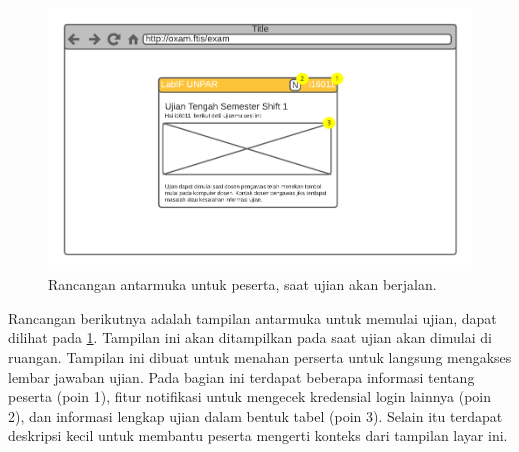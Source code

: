     \begin{figure}[H]
        \centering
        \includegraphics[width=0.7\paperwidth]{Gambar/mockups/Mockup--Peserta - Prestartstate.pdf}
        \caption{Rancangan antarmuka untuk peserta, saat ujian akan berjalan.}
        \label{fig:mockup_peserta_prestartstate}
    \end{figure}
    Rancangan berikutnya adalah tampilan antarmuka untuk memulai ujian, dapat
    dilihat pada \ref{fig:mockup_peserta_prestartstate}. Tampilan ini akan
    ditampilkan pada saat ujian akan dimulai di ruangan. Tampilan ini dibuat
    untuk menahan perserta untuk langsung mengakses lembar jawaban ujian. Pada
    bagian ini terdapat beberapa informasi tentang peserta (poin 1), fitur
    notifikasi untuk mengecek kredensial login lainnya (poin 2), dan informasi
    lengkap ujian dalam bentuk tabel (poin 3). Selain itu terdapat deskripsi
    kecil untuk membantu peserta mengerti konteks dari tampilan layar ini. 
    
